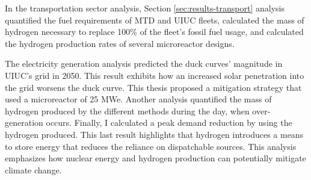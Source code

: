 In the transportation sector analysis, Section \ref{sec:results-transport} analysis quantified the fuel requirements of \gls{MTD} and \gls{UIUC} fleets, calculated the mass of hydrogen necessary to replace 100$\%$ of the fleet's fossil fuel usage, and calculated the hydrogen production rates of several microreactor designs.

The electricity generation analysis predicted the duck curves' magnitude in UIUC's grid in 2050.
This result exhibits how an increased solar penetration into the grid worsens the duck curve.
This thesis proposed a mitigation strategy that used a microreactor of 25 MWe.
Another analysis quantified the mass of hydrogen produced by the different methods during the day, when over-generation occurs.
Finally, I calculated a peak demand reduction by using the hydrogen produced.
This last result highlights that hydrogen introduces a means to store energy that reduces the reliance on dispatchable sources.
This analysis emphasizes how nuclear energy and hydrogen production can potentially mitigate climate change.
